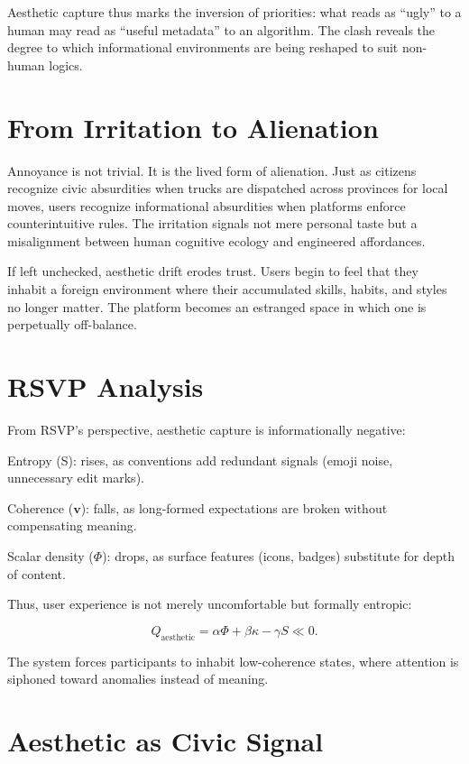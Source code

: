 \documentclass{book}
\begin{document}
Aesthetic capture thus marks the inversion of priorities: what reads as ``ugly'' to a human may read as ``useful metadata'' to an algorithm. The clash reveals the degree to which informational environments are being reshaped to suit non-human logics.

\section{From Irritation to Alienation}

Annoyance is not trivial. It is the lived form of alienation. Just as citizens recognize civic absurdities when trucks are dispatched across provinces for local moves, users recognize informational absurdities when platforms enforce counterintuitive rules. The irritation signals not mere personal taste but a misalignment between human cognitive ecology and engineered affordances.

If left unchecked, aesthetic drift erodes trust. Users begin to feel that they inhabit a foreign environment where their accumulated skills, habits, and styles no longer matter. The platform becomes an estranged space in which one is perpetually off-balance.

\section{RSVP Analysis}

From RSVP’s perspective, aesthetic capture is informationally negative:

Entropy (S): rises, as conventions add redundant signals (emoji noise, unnecessary edit marks).

Coherence (\(\mathbf{v}\)): falls, as long-formed expectations are broken without compensating meaning.

Scalar density (\(\Phi\)): drops, as surface features (icons, badges) substitute for depth of content.

Thus, user experience is not merely uncomfortable but formally entropic:

\[ Q_{\text{aesthetic}} = \alpha \Phi + \beta \kappa - \gamma S \ll 0. \]

The system forces participants to inhabit low-coherence states, where attention is siphoned toward anomalies instead of meaning.

\section{Aesthetic as Civic Signal}
\end{document}
